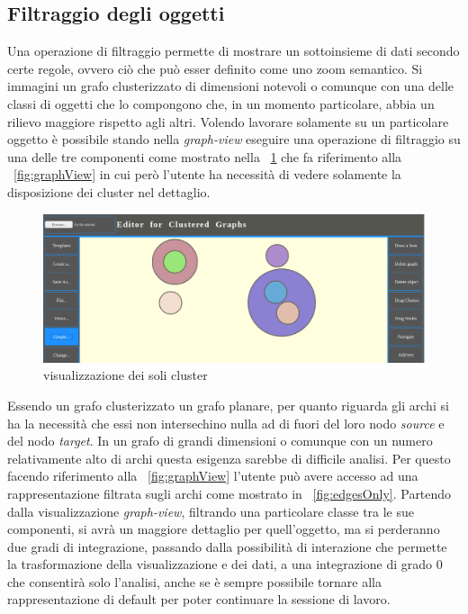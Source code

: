 {\subsection{Filtraggio degli oggetti}
Una operazione di filtraggio permette di mostrare un sottoinsieme di dati secondo certe regole, ovvero ciò che può esser definito come uno zoom semantico. Si immagini un grafo clusterizzato di dimensioni notevoli o comunque con una delle classi di oggetti che lo compongono che, in un momento particolare, abbia un rilievo maggiore rispetto agli altri. Volendo lavorare solamente su un particolare oggetto è possibile stando nella \textit{graph-view} eseguire una operazione di filtraggio su una delle tre componenti come mostrato nella \figurename~\ref{fig:clustersOnly} che fa riferimento  alla \figurename~\ref{fig:graphView} in cui però l'utente ha necessità di vedere solamente la disposizione dei cluster nel dettaglio.
\begin{figure}[!htb]
	\begin{center}
		\includegraphics[width=1 \linewidth]{figure/clustersOnly}
	\end{center}
	\caption{visualizzazione dei soli cluster\label{fig:clustersOnly}}
\end{figure}
Essendo un grafo clusterizzato un grafo planare, per quanto riguarda gli archi si ha la necessità che essi non intersechino nulla ad di fuori del loro nodo \textit{source} e del nodo \textit{target}. In un grafo di grandi dimensioni o comunque con un numero relativamente alto di archi questa esigenza sarebbe di difficile analisi. Per questo facendo riferimento alla \figurename~\ref{fig:graphView} l'utente può avere accesso ad una rappresentazione filtrata sugli archi come mostrato in \figurename~\ref{fig:edgesOnly}. Partendo dalla visualizzazione \textit{graph-view}, filtrando una particolare classe tra le sue componenti, si avrà un maggiore dettaglio per quell'oggetto, ma si perderanno due gradi di integrazione, passando dalla possibilità di interazione che permette la trasformazione della visualizzazione e dei dati, a una integrazione di grado $0$ che consentirà solo l'analisi, anche se è sempre possibile tornare alla rappresentazione di default per poter continuare la sessione di lavoro.  
}
